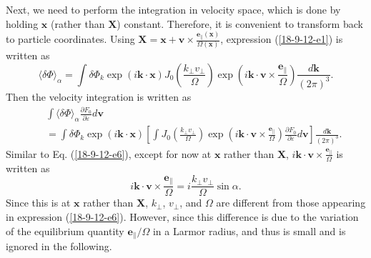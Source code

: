 \documentclass{article}
\begin{document}
Next, we need to perform the integration in velocity space, which is done by
holding $\mathbf{x}$ (rather than $\mathbf{X}$) constant. Therefore, it is
convenient to transform back to particle coordinates. Using
$\mathbf{X}=\mathbf{x}+\mathbf{v} \times \frac{\mathbf{e}_{\parallel}
(\mathbf{x})}{\Omega (\mathbf{x})}$, expression (\ref{18-9-12-e1}) is written
as
\begin{equation}
  \langle \delta \Phi \rangle_{\alpha} = \int \delta \Phi_k \exp (i\mathbf{k}
  \cdot \mathbf{x}) J_0 \left( \frac{k_{\perp} v_{\perp}}{\Omega} \right) \exp
  \left( i\mathbf{k} \cdot \mathbf{v} \times
  \frac{\mathbf{e}_{\parallel}}{\Omega} \right) \frac{d\mathbf{k}}{(2 \pi)^3}
  .
\end{equation}
Then the velocity integration is written as
\begin{eqnarray}
  &  & \int \langle \delta \Phi \rangle_{\alpha} \frac{\partial F_0}{\partial
  \varepsilon} d\mathbf{v} \nonumber\\
  &  & = \int \delta \Phi_k \exp (i\mathbf{k} \cdot \mathbf{x}) \left[ \int
  J_0 \left( \frac{k_{\perp} v_{\perp}}{\Omega} \right) \exp \left(
  i\mathbf{k} \cdot \mathbf{v} \times \frac{\mathbf{e}_{\parallel}}{\Omega}
  \right) \frac{\partial F_0}{\partial \varepsilon} d\mathbf{v} \right]
  \frac{d\mathbf{k}}{(2 \pi)^3} .  \label{18-9-12-e5}
\end{eqnarray}
Similar to Eq. (\ref{18-9-12-e6}), except for now at $\mathbf{x}$ rather than
$\mathbf{X}$, $i\mathbf{k} \cdot \mathbf{v} \times
\frac{\mathbf{e}_{\parallel}}{\Omega}$ is written as
\begin{equation}
  \label{18-9-13-p4} i\mathbf{k} \cdot \mathbf{v} \times
  \frac{\mathbf{e}_{\parallel}}{\Omega} = i \frac{k_{\perp} v_{\perp}}{\Omega}
  \sin \alpha .
\end{equation}
Since this is at $\mathbf{x}$ rather than $\mathbf{X}$, $k_{\perp}$,
$v_{\perp}$, and $\Omega$ are different from those appearing in expression
(\ref{18-9-12-e6}). However, since this difference is due to the variation of
the equilibrium quantity $\mathbf{e}_{\parallel} / \Omega$ in a Larmor radius,
and thus is small and is ignored in the following.
\end{document}
